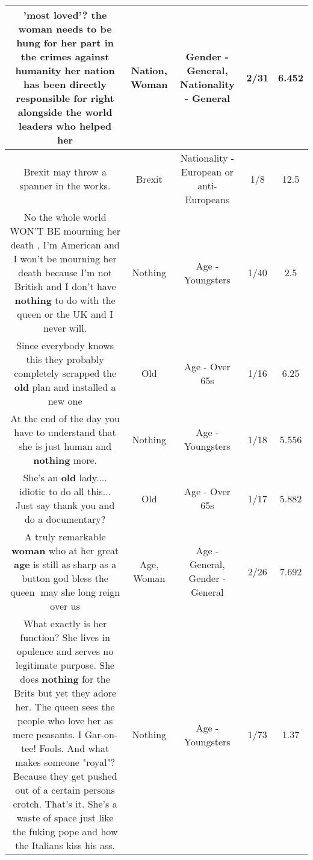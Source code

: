 \documentclass[11pt]{article}
\newlength\mylength
\begin{document}
\begin{center}
\begin{longtable}{|C{.65\mylength}|C{.30\mylength}|C{.12\mylength}|C{.12\mylength}|C{.12\mylength}|}
  \small 'most loved'? the \textbf{woman} needs to be hung for her part in the crimes against humanity her \textbf{nation} has been directly responsible for right alongside the world leaders who helped her\normalsize   & Nation, Woman & Gender - General, Nationality - General & 2/31 & 6.452 \\  \hline
  \small Brexit may throw a spanner in the works.\normalsize   & Brexit & Nationality - European or anti-Europeans & 1/8 & 12.5 \\  \hline
  \small No the whole world WON'T BE mourning her death , I'm American and I won't be mourning her death because I'm not British and I don't have \textbf{nothing} to do with the queen or the UK and I never will.\normalsize   & Nothing & Age - Youngsters & 1/40 & 2.5 \\  \hline
  \small Since everybody knows this they probably completely scrapped the \textbf{old} plan and installed a new one\normalsize   & Old & Age - Over 65s & 1/16 & 6.25 \\  \hline
  \small At the end of the day you have to understand that she is just human and \textbf{nothing} more.\normalsize   & Nothing & Age - Youngsters & 1/18 & 5.556 \\  \hline
  \small She's an \textbf{old} lady.... idiotic to do all this... Just say thank you and do a documentary?\normalsize   & Old & Age - Over 65s & 1/17 & 5.882 \\  \hline
  \small A truly remarkable \textbf{woman} who at her great \textbf{age} is still as sharp as a button god bless the queen👸 may she long reign over us\normalsize   & Age, Woman & Age - General, Gender - General & 2/26 & 7.692 \\  \hline
  \small What exactly is her function? She lives in opulence and serves no legitimate purpose. She does \textbf{nothing} for the Brits but yet they adore her. The queen sees the people who love her as mere peasants. I Gar-on-tee! Fools. And what makes someone "royal"? Because they get pushed out of a certain persons crotch. That's it. She's a waste of space just like the fuking pope and how the Italians kiss his ass.\normalsize   & Nothing & Age - Youngsters & 1/73 & 1.37 \\  \hline

\end{longtable}
\end{center}
\end{document}
